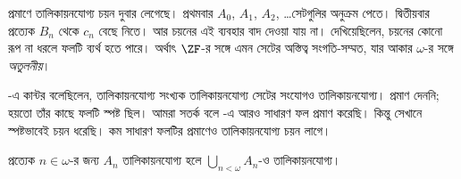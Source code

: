 \documentclass[../../../include/open-logic-section]{subfiles}
\begin{document}
\begin{ex}
প্রমাণে তালিকায়নযোগ্য চয়ন দুবার লেগেছে।
প্রথমবার $A_0$, $A_1$, $A_2$, \dots\@ সেটগুলির
অনুক্রম পেতে। দ্বিতীয়বার প্রত্যেক $B_n$ থেকে
$c_n$ বেছে নিতে। আর চয়নের এই ব্যবহার
বাদ দেওয়া যায় না। \citet[p.~138]{Cohen1966}
দেখিয়েছিলেন, চয়নের কোনো রূপ না ধরলে ফলটি
ব্যর্থ হতে পারে। অর্থাৎ $\ZF$-র সঙ্গে এমন
সেটের অস্তিত্ব সংগতি-সম্মত, যার আকার
$\omega$-র সঙ্গে \emph{অতুলনীয়}।
\end{ex}

\begin{ex}
\citeyear{Cantor1878}-এ কান্টর বলেছিলেন,
তালিকায়নযোগ্য সংখ্যক তালিকায়নযোগ্য সেটের
সংযোগও তালিকায়নযোগ্য। প্রমাণ দেননি;
হয়তো তাঁর কাছে ফলটি স্পষ্ট ছিল। আমরা সতর্ক
বলে -এ
আরও সাধারণ ফল প্রমাণ করেছি। কিন্তু সেখানে
স্পষ্টভাবেই চয়ন ধরেছি। কম সাধারণ ফলটির
প্রমাণেও তালিকায়নযোগ্য চয়ন লাগে।

\begin{thm}
প্রত্যেক $n\in\omega$-র জন্য $A_n$
তালিকায়নযোগ্য হলে
$\bigcup_{n<\omega}A_n$-ও তালিকায়নযোগ্য।
\end{thm}


\end{ex}
\end{document}
